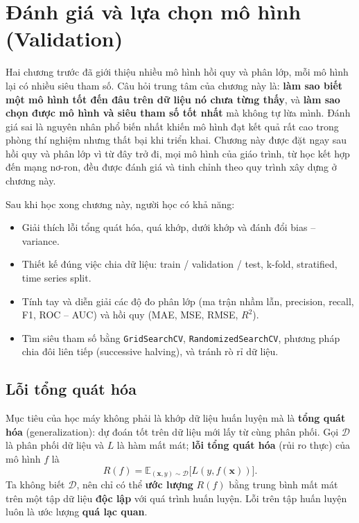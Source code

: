 
\chapter{Đánh giá và lựa chọn mô hình \\ (Validation)}
\label{chap:validation}

Hai chương trước đã giới thiệu nhiều mô hình hồi quy và phân lớp, mỗi mô hình lại có nhiều siêu tham số. Câu hỏi trung tâm của chương này là: \textbf{làm sao biết một mô hình tốt đến đâu trên dữ liệu nó chưa từng thấy}, và \textbf{làm sao chọn được mô hình và siêu tham số tốt nhất} mà không tự lừa mình. Đánh giá sai là nguyên nhân phổ biến nhất khiến mô hình đạt kết quả rất cao trong phòng thí nghiệm nhưng thất bại khi triển khai. Chương này được đặt ngay sau hồi quy và phân lớp vì từ đây trở đi, mọi mô hình của giáo trình, từ học kết hợp đến mạng nơ-ron, đều được đánh giá và tinh chỉnh theo quy trình xây dựng ở chương này.

\noindent Sau khi học xong chương này, người học có khả năng:
\begin{itemize}
    \item Giải thích lỗi tổng quát hóa, quá khớp, dưới khớp và đánh đổi bias -- variance.
    \item Thiết kế đúng việc chia dữ liệu: train / validation / test, k-fold, stratified, time series split.
    \item Tính tay và diễn giải các độ đo phân lớp (ma trận nhầm lẫn, precision, recall, F1, ROC -- AUC) và hồi quy (MAE, MSE, RMSE, $R^2$).
    \item Tìm siêu tham số bằng \texttt{GridSearchCV}, \texttt{RandomizedSearchCV}, phương pháp chia đôi liên tiếp (successive halving), và tránh rò rỉ dữ liệu.
\end{itemize}

\section{Lỗi tổng quát hóa}

Mục tiêu của học máy không phải là khớp dữ liệu huấn luyện mà là \textbf{tổng quát hóa} (generalization): dự đoán tốt trên dữ liệu mới lấy từ cùng phân phối. Gọi $\mathcal{D}$ là phân phối dữ liệu và $L$ là hàm mất mát; \textbf{lỗi tổng quát hóa} (rủi ro thực) của mô hình $f$ là
\begin{equation}
    R(f) = \mathbb{E}_{(\mathbf{x}, y) \sim \mathcal{D}}\big[L(y, f(\mathbf{x}))\big].
\end{equation}
Ta không biết $\mathcal{D}$, nên chỉ có thể \textbf{ước lượng} $R(f)$ bằng trung bình mất mát trên một tập dữ liệu \textbf{độc lập} với quá trình huấn luyện. Lỗi trên tập huấn luyện luôn là ước lượng \textbf{quá lạc quan}.


